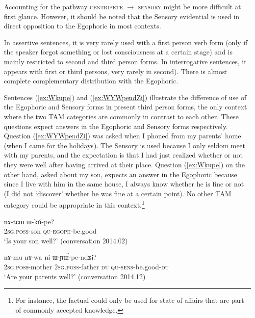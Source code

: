 \documentclass[oldfontcommands,oneside,a4paper,11pt]{article}
\newcommand{\ipa}[1]{\mbox{\phon #1}} %
\begin{document}
Accounting for the pathway \textsc{centripete} $\rightarrow$ \textsc{sensory} might be more difficult at first glance. However, it should be noted that the Sensory evidential is used in direct opposition to the Egophoric in most contexts. 

In assertive sentences, it is very rarely used with a first person verb form (only if the speaker forgot something or lost consciousness at a certain stage) and is mainly restricted to second and third person forms. In interrogative sentences, it appears with first or third persons, very rarely in second). There is almost complete complementary distribution with the Egophoric. 
 
Sentences (\ref{ex:Wkupe}) and (\ref{ex:WYWpendZi}) illustrate the difference of use of the Egophoric and Sensory forms in present third person forms, the only context where the two TAM categories are commonly in contrast to each other. These questions expect answers in the Egophoric and Sensory forms respectively. Question (\ref{ex:WYWpendZi}) was asked when I phoned from my parents' home (when I came for the holidays). The Sensory is used because I only seldom meet with my parents, and the expectation is that I had just realized whether or not they were well after having arrived at their place. Question (\ref{ex:Wkupe}) on the other hand, asked about my son, expects an answer in the Egophoric because since I live with him in the same house, I always know whether he is fine or not (I did not `discover' whether he was fine at a certain point). No other TAM category could be appropriate in this context.\footnote{For instance, the factual could only be used for state of affairs that are part of commonly accepted knowledge.}
 
\begin{exe}
\ex \label{ex:Wkupe}
\gll \ipa{nɤ-tɕɯ} \ipa{ɯ-kú-pe?}\\
\textsc{2sg.poss}-son \textsc{qu-egoph}-be.good\\
\glt `Is your son well?' (conversation 2014.02)
\end{exe}

\begin{exe}
\ex \label{ex:WYWpendZi}
\gll 
\ipa{nɤ-mu}  	\ipa{nɤ-wa}  	\ipa{ni}  	\ipa{ɯ-ɲɯ́-pe-ndʑi?}  \\
\textsc{2sg.poss}-mother \textsc{2sg.poss}-father \textsc{du} \textsc{qu-sens}-be.good-\textsc{du} \\
\glt `Are your parents well?' (conversation 2014.12)
\end{exe}
\end{document}
